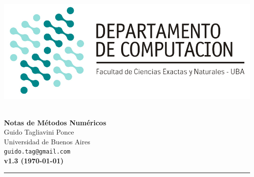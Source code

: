 \hfill \includegraphics[scale = 0.75]{imagenes/logo_dc.jpg}~\\[0.25cm]

\begin{center}
	\textbf{\Large Notas de Métodos Numéricos}\\[1cm]
	{\large Guido Tagliavini Ponce\\[0.15cm]}
	Universidad de Buenos Aires\\[0.15cm]
	\texttt{guido.tag@gmail.com}\\[1cm]
	\textbf{v1.3 (\today)}\\[1cm]
\end{center}
\rule{\linewidth}{0.2mm}
